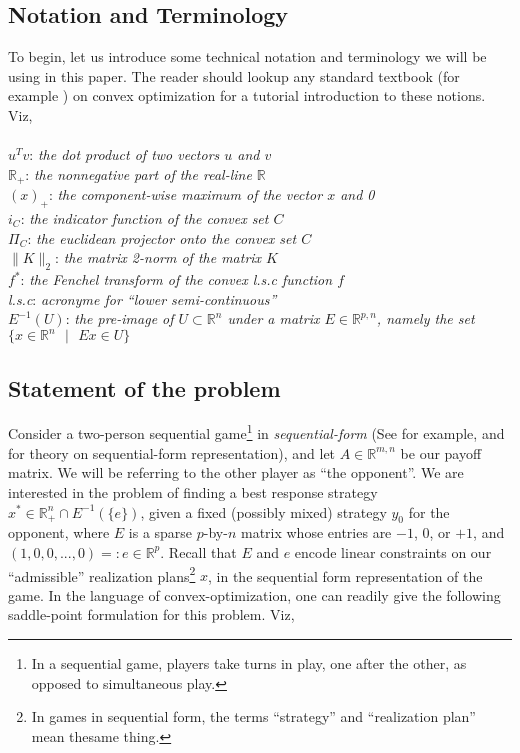 \documentclass[a4paper,10pt,journal]{IEEEtran}
\begin{document}
\subsection{Notation and Terminology}
To begin, let us introduce some technical notation and terminology we will be using in this paper. The reader should lookup any standard textbook
(for example \cite{boyd2004}) on convex optimization for a tutorial introduction to these notions. Viz,\\\\
$u^Tv$: \quad \textit{the dot product of two vectors $u$ and $v$}\\
$\mathbb{R}_+$: \quad \textit{the nonnegative part of the real-line $\mathbb{R}$}\\
$(x)_+$: \quad \textit{the component-wise maximum of the vector $x$ and 0}\\
$i_C$: \quad \textit{the indicator function of the convex set $C$}\\
$\Pi_C$: \quad \textit{the euclidean projector onto the convex set $C$}\\
$\|K\|_2$: \quad \textit{the matrix 2-norm of the matrix $K$}\\
$f^*$: \quad \textit{the Fenchel transform of the convex l.s.c function $f$}\\
\textit{l.s.c}: \quad \textit{acronyme for ``lower semi-continuous''}\\
$E^{-1}(U)$: \quad \textit{the pre-image of $U \subset \mathbb{R}^n$ under a matrix $E \in \mathbb{R}^{p,n}$,
namely the set $\{x \in \mathbb{R}^n\text{ }| \text{ }Ex \in U\}$}

\subsection{Statement of the problem}
Consider a two-person sequential game\footnote{In a sequential game, players take turns in play, one after the other,
as opposed to simultaneous play.} in \textit{sequential-form} (See for example, \cite{von1996efficient} and \cite{koller1996efficient} 
for theory on sequential-form representation), and let $A \in \mathbb{R}^{m,n}$ be our payoff matrix.
We will be referring to the other player as ``the opponent''. We are interested in the problem of
finding a best response strategy $x^* \in \mathbb{R}_{+}^n \cap E^{-1}(\{e\})$, given a fixed
(possibly mixed) strategy $y_0$ for the opponent, where $E$ is a sparse $p$-by-$n$ matrix whose entries are $-1$, $0$, or $+1$,
and $(1, 0, 0, ..., 0) =: e \in \mathbb{R}^p$. Recall that $E$ and $e$ encode linear constraints on our ``admissible''
realization plans\footnote{In games in sequential form, the terms ``strategy'' and ``realization plan''
mean thesame thing.} $x$, in the sequential form representation of the game.
In the language of convex-optimization,
one can readily give the following saddle-point formulation for this problem. Viz,
\end{document}
